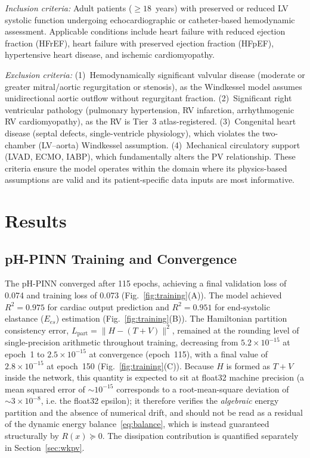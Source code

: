 \documentclass[journal]{IEEEtran}
\begin{document}
\emph{Inclusion criteria:} Adult patients ($\ge 18$~years) with preserved or reduced LV systolic function undergoing echocardiographic or catheter-based hemodynamic assessment. Applicable conditions include heart failure with reduced ejection fraction (HFrEF), heart failure with preserved ejection fraction (HFpEF), hypertensive heart disease, and ischemic cardiomyopathy.

\emph{Exclusion criteria:} (1)~Hemodynamically significant valvular disease (moderate or greater mitral/aortic regurgitation or stenosis), as the Windkessel model assumes unidirectional aortic outflow without regurgitant fraction. (2)~Significant right ventricular pathology (pulmonary hypertension, RV infarction, arrhythmogenic RV cardiomyopathy), as the RV is Tier~3 atlas-registered. (3)~Congenital heart disease (septal defects, single-ventricle physiology), which violates the two-chamber (LV--aorta) Windkessel assumption. (4)~Mechanical circulatory support (LVAD, ECMO, IABP), which fundamentally alters the PV relationship. These criteria ensure the model operates within the domain where its physics-based assumptions are valid and its patient-specific data inputs are most informative.

\section{Results}\label{sec:results}

\subsection{pH-PINN Training and Convergence}\label{sec:train}
The pH-PINN converged after 115 epochs, achieving a final validation loss of 0.074 and training loss of 0.073 (Fig.~\ref{fig:training}(A)). The model achieved $R^2=0.975$ for cardiac output prediction and $R^2=0.951$ for end-systolic elastance ($E_{es}$) estimation (Fig.~\ref{fig:training}(B)). The Hamiltonian partition consistency error, $L_{\text{part}}=\lVert H-(T+V)\rVert^{2}$, remained at the rounding level of single-precision arithmetic throughout training, decreasing from $5.2\times10^{-15}$ at epoch~1 to $2.5\times10^{-15}$ at convergence (epoch~115), with a final value of $2.8\times10^{-15}$ at epoch~150 (Fig.~\ref{fig:training}(C)). Because $H$ is formed as $T+V$ inside the network, this quantity is expected to sit at float32 machine precision (a mean squared error of ${\sim}10^{-15}$ corresponds to a root-mean-square deviation of ${\sim}3\times10^{-8}$, i.e. the float32 epsilon); it therefore verifies the \emph{algebraic} energy partition and the absence of numerical drift, and should not be read as a residual of the dynamic energy balance~\eqref{eq:balance}, which is instead guaranteed structurally by $R(x)\succeq0$. The dissipation contribution is quantified separately in Section~\ref{sec:wkpv}.
\end{document}
